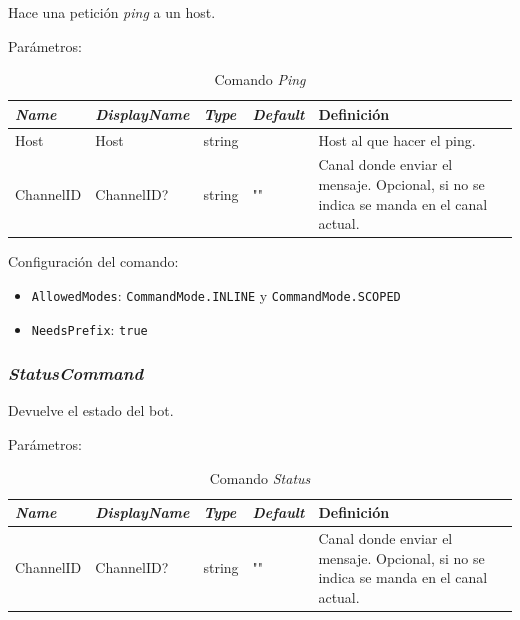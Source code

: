 Hace una petición \textit{ping} a un host.

Parámetros:

\begin{table}[H]
    \centering
    \def\arraystretch{1.25}
    \begin{adjustbox}{max width=\textwidth}
    \begin{tabularx}{\textwidth}{|l|l|l|l|L|}
    \hline
        \textbf{\textit{Name}} & \textbf{\textit{DisplayName}} & \textbf{\textit{Type}} & \textbf{\textit{Default}} & \textbf{Definición} \\ \hline
    \hline
        Host & Host & string & ~ & Host al que hacer el ping. \\ \hline
        ChannelID & ChannelID? & string & "" & Canal donde enviar el mensaje. Opcional, si no se indica se manda en el canal actual. \\ \hline
    \end{tabularx}
    \end{adjustbox}
    \caption{Comando \textit{Ping}}
\end{table}

Configuración del comando:

\begin{itemize}
	\item \verb|AllowedModes|: \verb|CommandMode.INLINE| y \verb|CommandMode.SCOPED|
	\item \verb|NeedsPrefix|: \verb|true|
\end{itemize}


\subsubsection{\textit{StatusCommand}}

Devuelve el estado del bot.

Parámetros:

\begin{table}[H]
    \centering
    \def\arraystretch{1.25}
    \begin{adjustbox}{max width=\textwidth}
    \begin{tabularx}{\textwidth}{|l|l|l|l|L|}
    \hline
        \textbf{\textit{Name}} & \textbf{\textit{DisplayName}} & \textbf{\textit{Type}} & \textbf{\textit{Default}} & \textbf{Definición} \\ \hline
    \hline
        ChannelID & ChannelID? & string & "" & Canal donde enviar el mensaje. Opcional, si no se indica se manda en el canal actual. \\ \hline
    \end{tabularx}
    \end{adjustbox}
    \caption{Comando \textit{Status}}
\end{table}

